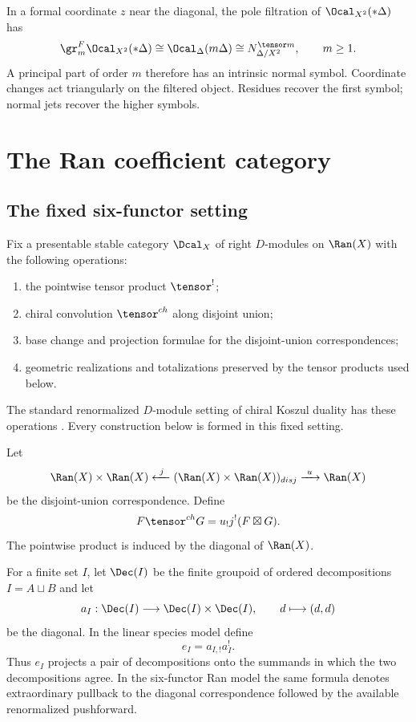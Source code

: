In a formal coordinate $z$ near the diagonal, the pole filtration of $\Ocal_{X^2}(*\Delta)$ has
\[
 \gr_m^F\Ocal_{X^2}(*\Delta)
 \cong \Ocal_{\Delta}(m\Delta)
 \cong N_{\Delta/X^2}^{\tensor m},\qquad m\ge 1.
\]
A principal part of order $m$ therefore has an intrinsic normal symbol. Coordinate changes act triangularly on the filtered object. Residues recover the first symbol; normal jets recover the higher symbols.

\chapter{The Ran coefficient category}
\section{The fixed six-functor setting}
Fix a presentable stable category $\Dcal_X$ of right $D$-modules on $\Ran(X)$ with the following operations:
\begin{enumerate}
\item the pointwise tensor product $\tensor^{!}$;
\item chiral convolution $\tensor^{\ch}$ along disjoint union;
\item base change and projection formulae for the disjoint-union correspondences;
\item geometric realizations and totalizations preserved by the tensor products used below.
\end{enumerate}
The standard renormalized $D$-module setting of chiral Koszul duality has these operations \cite{FG12}. Every construction below is formed in this fixed setting.

Let
\[
  \Ran(X)\times\Ran(X) \xleftarrow{\ j\ }
  (\Ran(X)\times\Ran(X))_{\mathrm{disj}}
  \xrightarrow{\ u\ }\Ran(X)
\]
be the disjoint-union correspondence. Define
\[
 F\tensor^{\ch}G=u_!j^!(F\boxtimes G).
\]
The pointwise product is induced by the diagonal of $\Ran(X)$.

\begin{definition}
For a finite set $I$, let $\Dec(I)$ be the finite groupoid of ordered decompositions $I=A\sqcup B$ and let
\[
 a_I:\Dec(I)\longrightarrow\Dec(I)\times\Dec(I),\qquad d\longmapsto(d,d)
\]
be the diagonal.  In the linear species model define
\[
 e_I=a_{I,!}a_I^!.
\]
Thus $e_I$ projects a pair of decompositions onto the summands in which the two decompositions agree.  In the six-functor Ran model the same formula denotes extraordinary pullback to the diagonal correspondence followed by the available renormalized pushforward.
\end{definition}


